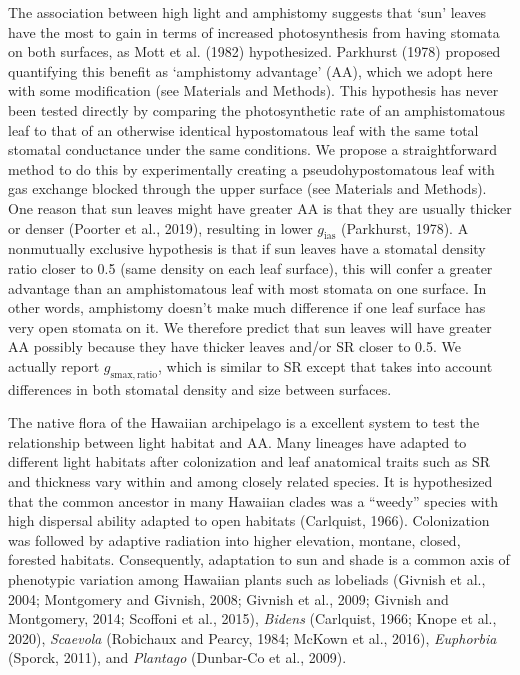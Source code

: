 \documentclass[
  letterpaper,
  DIV=11,
  numbers=noendperiod]{scrartcl}
\begin{document}
The association between high light and amphistomy suggests that `sun'
leaves have the most to gain in terms of increased photosynthesis from
having stomata on both surfaces, as Mott et al. (1982) hypothesized.
Parkhurst (1978) proposed quantifying this benefit as `amphistomy
advantage' (\(\mathrm{AA}\)), which we adopt here with some modification
(see Materials and Methods). This hypothesis has never been tested
directly by comparing the photosynthetic rate of an amphistomatous leaf
to that of an otherwise identical hypostomatous leaf with the same total
stomatal conductance under the same conditions. We propose a
straightforward method to do this by experimentally creating a
pseudohypostomatous leaf with gas exchange blocked through the upper
surface (see Materials and Methods). One reason that sun leaves might
have greater \(\mathrm{AA}\) is that they are usually thicker or denser
(Poorter et al., 2019), resulting in lower \(g_\mathrm{ias}\)
(Parkhurst, 1978). A nonmutually exclusive hypothesis is that if sun
leaves have a stomatal density ratio closer to 0.5 (same density on each
leaf surface), this will confer a greater advantage than an
amphistomatous leaf with most stomata on one surface. In other words,
amphistomy doesn't make much difference if one leaf surface has very
open stomata on it. We therefore predict that sun leaves will have
greater \(\mathrm{AA}\) possibly because they have thicker leaves and/or
\(\mathrm{SR}\) closer to 0.5. We actually report
\(g_{\mathrm{smax,ratio}}\), which is similar to \(\mathrm{SR}\) except
that takes into account differences in both stomatal density and size
between surfaces.

The native flora of the Hawaiian archipelago is a excellent system to
test the relationship between light habitat and \(\mathrm{AA}\). Many
lineages have adapted to different light habitats after colonization and
leaf anatomical traits such as \(\mathrm{SR}\) and thickness vary within
and among closely related species. It is hypothesized that the common
ancestor in many Hawaiian clades was a ``weedy'' species with high
dispersal ability adapted to open habitats (Carlquist, 1966).
Colonization was followed by adaptive radiation into higher elevation,
montane, closed, forested habitats. Consequently, adaptation to sun and
shade is a common axis of phenotypic variation among Hawaiian plants
such as lobeliads (Givnish et al., 2004; Montgomery and Givnish, 2008;
Givnish et al., 2009; Givnish and Montgomery, 2014; Scoffoni et al.,
2015), \emph{Bidens} (Carlquist, 1966; Knope et al., 2020),
\emph{Scaevola} (Robichaux and Pearcy, 1984; McKown et al., 2016),
\emph{Euphorbia} (Sporck, 2011), and \emph{Plantago} (Dunbar-Co et al.,
2009).
\end{document}
